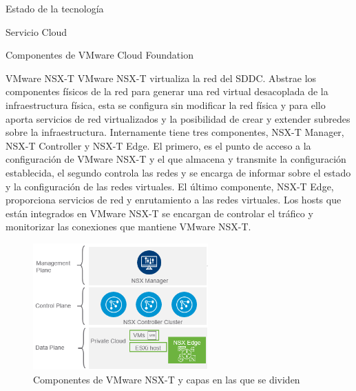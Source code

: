 \begin{chapter}{Estado de la tecnología}
\begin{section}{Servicio Cloud}
\begin{subsection}{Componentes de VMware Cloud Foundation}
    \begin{subsubsection}{VMware NSX-T}
        VMware NSX-T virtualiza la red del SDDC. Abstrae los componentes físicos de la red para generar una red virtual desacoplada de la infraestructura física, esta se configura sin modificar la red física y para ello aporta servicios de red virtualizados y la posibilidad de crear y extender subredes sobre la infraestructura. Internamente tiene tres componentes, NSX-T Manager, NSX-T Controller y NSX-T Edge. El primero, es el punto de acceso a la configuración de VMware NSX-T y el que almacena y transmite la configuración establecida, el segundo controla las redes y se encarga de informar sobre el estado y la configuración de las redes virtuales. El último componente, NSX-T Edge, proporciona servicios de red y enrutamiento a las redes virtuales. Los hosts que están integrados en VMware NSX-T se encargan de controlar el tráfico y monitorizar las conexiones que mantiene VMware NSX-T.
        \begin{figure}[h!]
            \centering
                \includegraphics[width=0.6\textwidth]{imaxes/VCF-componentes/nsx-t-layers.png}
                \caption{Componentes de VMware NSX-T y capas en las que se dividen}
                \label{fig:nsx-t-components}
            \end{figure}
            \FloatBarrier
    \end{subsubsection}
    

\end{subsection}
\end{section}
\end{chapter}
